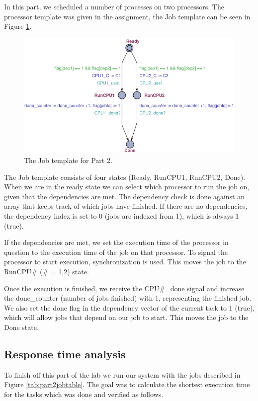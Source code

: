 \documentclass[a4paper,10pt]{article}
\begin{document}
In this part, we scheduled a number of processes on two processors. The processor template was given in the assignment, the Job template can be seen in Figure \ref{img:part2extendedJob}.

\begin{figure}[h]
  \center
  \includegraphics{Part2Extended}
  \caption{The Job template for Part 2.}
  \label{img:part2extendedJob}
\end{figure}

The Job template consists of four states (Ready, RunCPU1, RunCPU2, Done). When we are in the ready state we can select which processor to run the job on, given that the dependencies are met. The dependency check is done against an array that keeps track of which jobs have finished. If there are no dependencies, the dependency index is set to 0 (jobs are indexed from 1), which is always 1 (true).

If the dependencies are met, we set the execution time of the processor in question to the execution time of the job on that processor. To signal the processor to start execution, synchronization is used. This moves the job to the RunCPU\# (\# = 1,2) state.

Once the execution is finished, we receive the CPU\#\_done signal and increase the done\_counter (number of jobs finished) with 1, representing the finished job. We also set the done flag in the dependency vector of the current task to 1 (true), which will allow jobs that depend on our job to start. This moves the job to the Done state.

\subsection*{Response time analysis}

To finish off this part of the lab we run our system with the jobs described in Figure \ref{tab:part2jobtable}. The goal was to calculate the shortest execution time for the tasks which was done and verified as follows.
\end{document}
